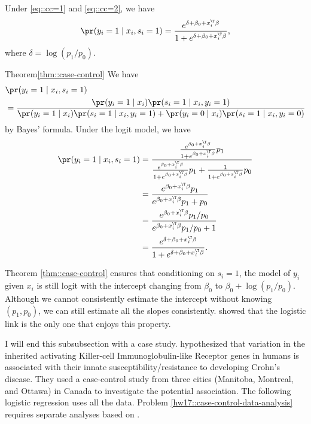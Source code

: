 \begin{theorem}
\label{thm::case-control}
Under \eqref{eq::cc=1} and \eqref{eq::cc=2}, we have 
$$
\pr(y_{i}  =1\mid x_{i},s_{i}=1)
= \frac{e^{\delta+\beta_{0}+x_{i}^{\T}\beta}}{1+e^{\delta+\beta_{0}+x_{i}^{\T}\beta}}, 
$$
where $\delta=\log(p_{1}/p_{0})$. 
\end{theorem}

\begin{myproof}{Theorem}{\ref{thm::case-control}}
We have 
\begin{align*}
&\pr(y_{i}  =1\mid x_{i},s_{i}=1)\\
 & =\frac{\pr(y_{i}=1\mid x_{i})\pr(s_{i}=1\mid x_{i},y_{i}=1)}{\pr(y_{i}=1\mid x_{i})\pr(s_{i}=1\mid x_{i},y_{i}=1)+\pr(y_{i}=0\mid x_{i})\pr(s_{i}=1\mid x_{i},y_{i}=0)}
 \end{align*}
 by Bayes' formula. Under the logit model, we have
 \begin{align*}
\pr(y_{i}  =1\mid x_{i},s_{i}=1)
 & =\frac{\frac{e^{\beta_{0}+x_{i}^{\T}\beta}}{1+e^{\beta_{0}+x_{i}^{\T}\beta}}p_{1}}{\frac{e^{\beta_{0}+x_{i}^{\T}\beta}}{1+e^{\beta_{0}+x_{i}^{\T}\beta}}p_{1}+\frac{1}{1+e^{\beta_{0}+x_{i}^{\T}\beta}}p_{0}}\\
 & =\frac{e^{\beta_{0}+x_{i}^{\T}\beta}p_{1}}{e^{\beta_{0}+x_{i}^{\T}\beta}p_{1}+p_{0}}\\
 & =\frac{e^{\beta_{0}+x_{i}^{\T}\beta}p_{1}/p_{0}}{e^{\beta_{0}+x_{i}^{\T}\beta}p_{1}/p_{0}+1}\\
 & =\frac{e^{\delta+\beta_{0}+x_{i}^{\T}\beta}}{1+e^{\delta+\beta_{0}+x_{i}^{\T}\beta}} . 
\end{align*}
\end{myproof}

Theorem \ref{thm::case-control} ensures that conditioning on $s_{i}=1$, the model of $y_{i}$ given $x_{i}$ is still logit with the intercept changing from $\beta_{0}$ to $\beta_{0}+\log(p_{1}/p_{0})$. Although we cannot consistently estimate the intercept without knowing $(p_{1},p_{0})$, we can still estimate all the slopes consistently. \citet{kagan2001note} showed that the logistic link is the only one that enjoys this property. 



I will end this subsubsection with a case study. 
\citet{samarani2019activating} hypothesized that variation in the inherited activating Killer-cell Immunoglobulin-like Receptor genes in humans is associated with their innate susceptibility/resistance to developing Crohn's disease. They used a case-control study from three cities (Manitoba,  Montreal, and Ottawa) in Canada to investigate the potential association. The following logistic regression uses all the data. 
Problem \ref{hw17::case-control-data-analysis} requires separate analyses based on .

